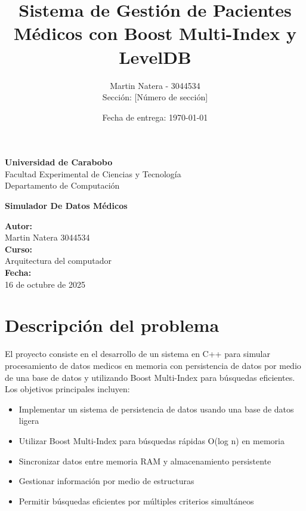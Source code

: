 \documentclass[12pt]{article}
\title{Sistema de Gestión de Pacientes Médicos con Boost Multi-Index y LevelDB}
\author{
	Martin Natera - 3044534 \\
	Sección: [Número de sección]
}
\date{Fecha de entrega: \today}
\begin{document}
	
	\begin{titlepage}
		\centering
		\vspace*{2cm}
		
		{\Large \textbf{Universidad de Carabobo}}\\[0.5cm]
		{\large Facultad Experimental de Ciencias y Tecnología}\\[0.3cm]
		{\large Departamento de Computación}\\[1.5cm]
		
		\vspace{1cm}
		
		{\Large \textbf{Simulador De Datos Médicos}}\\[2cm]
		
		\vspace{1cm}
		
		\textbf{Autor:}\\[0.3cm]
		Martin Natera 3044534\\[1cm]
		
		\textbf{Curso:}\\[0.3cm]
		Arquitectura del computador\\[1cm]
		
		\textbf{Fecha:}\\[0.3cm]
		16 de octubre de 2025
		
		\vfill
	\end{titlepage}
	
	\newpage
	
	\section{Descripción del problema}
	
	El proyecto consiste en el desarrollo de un sistema en C++ para simular procesamiento de datos medicos en memoria con persistencia de datos por medio de una base de datos y utilizando Boost Multi-Index para búsquedas eficientes. Los objetivos principales incluyen:
	
	\begin{itemize}
		\item Implementar un sistema de persistencia de datos usando una base de datos ligera
		\item Utilizar Boost Multi-Index para búsquedas rápidas O(log n) en memoria
		\item Sincronizar datos entre memoria RAM y almacenamiento persistente 
		\item Gestionar información por medio de estructuras 
		\item Permitir búsquedas eficientes por múltiples criterios simultáneos
	\end{itemize}
	
\end{document}
